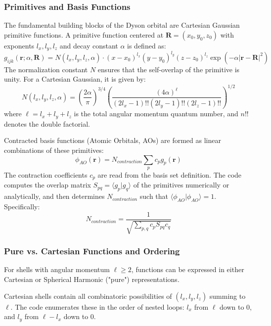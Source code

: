\documentclass{article}
\begin{document}
\subsubsection{Primitives and Basis Functions}
The fundamental building blocks of the Dyson orbital are Cartesian Gaussian primitive functions. A primitive function centered at $\mathbf{R} = (x_0, y_0, z_0)$ with exponents $l_x, l_y, l_z$ and decay constant $\alpha$ is defined as:
\begin{equation}
    g_{ijk}(\mathbf{r}; \alpha, \mathbf{R}) = N(l_x, l_y, l_z, \alpha) \cdot (x-x_0)^{l_x} (y-y_0)^{l_y} (z-z_0)^{l_z} \exp\left(-\alpha |\mathbf{r} - \mathbf{R}|^2\right)
\end{equation}
The normalization constant $N$ ensures that the self-overlap of the primitive is unity. For a Cartesian Gaussian, it is given by:
\begin{equation}
    N(l_x, l_y, l_z, \alpha) = \left( \frac{2\alpha}{\pi} \right)^{3/4} \left( \frac{(4\alpha)^{\ell}}{(2l_x - 1)!! (2l_y - 1)!! (2l_z - 1)!!} \right)^{1/2}
\end{equation}
where $\ell = l_x + l_y + l_z$ is the total angular momentum quantum number, and $n!!$ denotes the double factorial.

Contracted basis functions (Atomic Orbitals, AOs) are formed as linear combinations of these primitives:
\begin{equation}
    \phi_{AO}(\mathbf{r}) = N_{contraction} \sum_{p} c_p g_p(\mathbf{r})
\end{equation}
The contraction coefficients $c_p$ are read from the basis set definition. The code computes the overlap matrix $S_{pq} = \langle g_p | g_q \rangle$ of the primitives numerically or analytically, and then determines $N_{contraction}$ such that $\langle \phi_{AO} | \phi_{AO} \rangle = 1$. Specifically:
\begin{equation}
    N_{contraction} = \frac{1}{\sqrt{\sum_{p,q} c_p S_{pq} c_q}}
\end{equation}

\subsubsection{Pure vs. Cartesian Functions and Ordering}
For shells with angular momentum $\ell \ge 2$, functions can be expressed in either Cartesian or Spherical Harmonic ("pure") representations.

Cartesian shells contain all combinatoric possibilities of $(l_x, l_y, l_z)$ summing to $\ell$. The code enumerates these in the order of nested loops: $l_x$ from $\ell$ down to 0, and $l_y$ from $\ell - l_x$ down to 0.
\end{document}
